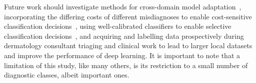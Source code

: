 Future work should investigate methods for cross-domain model adaptation~\citep{guan2021domain}, incorporating the differing costs of different misdiagnoses to enable cost-sensitive classification decisions~\citep{carse2021robust}, using well-calibrated classifiers to enable selective classification decisions~\citep{carse2022calibration}, and acquiring and labelling data prospectively during dermatology consultant triaging and clinical work to lead to larger local datasets and improve the performance of deep learning. It is important to note that a limitation of this study, like many others, is its restriction to a small number of diagnostic classes, albeit important ones.